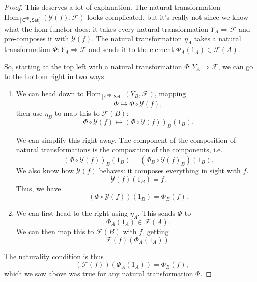 \documentclass[a4paper,10pt]{scrreprt}
\newcommand{\Hom}{\mathrm{Hom}}
\theoremstyle{definition}
\theoremstyle{plain}
\theoremstyle{remark}
\begin{document}
\begin{proof}
  This deserves a lot of explanation. The natural transformation $\Hom_{[\mathsf{C}^{\text{op}}, \mathsf{Set}]}(\mathcal{Y}(f), \mathcal{F})$ looks complicated, but it's really not since we know what the hom functor does: it takes every natural transformation $Y_{A} \Rightarrow \mathcal{F}$ and pre-composes it with $\mathcal{Y}(f)$. The natural transformation $\eta_{A}$ takes a natural transformation $\Phi\colon Y_{A} \Rightarrow \mathcal{F}$ and sends it to the element $\Phi_{A}(1_{A}) \in \mathcal{F}(A)$.

  So, starting at the top left with a natural transformation $\Phi\colon Y_{A} \Rightarrow \mathcal{F}$, we can go to the bottom right in two ways.
  \begin{enumerate}
    \item We can head down to $\Hom_{[\mathsf{C}^{\text{op}}, \mathsf{Set}]}(Y_{B}, \mathcal{F})$, mapping 
      \begin{equation*}
        \Phi \mapsto \Phi \circ \mathcal{Y}(f),
      \end{equation*}
      then use $\eta_{B}$ to map this to $\mathcal{F}(B)$:
      \begin{equation*}
        \Phi \circ \mathcal{Y}(f) \mapsto (\Phi \circ \mathcal{Y}(f))_{B}(1_{B}).
      \end{equation*}

      We can simplify this right away. The component of the composition of natural transformations is the composition of the components, i.e.
      \begin{equation*}
        (\Phi \circ \mathcal{Y}(f))_{B}(1_{B}) = (\Phi_{B} \circ \mathcal{Y}(f)_{B})(1_{B}).
      \end{equation*}
      We also know how $\mathcal{Y}(f)$ behaves: it composes everything in sight with $f$.
      \begin{equation*}
        \mathcal{Y}(f)(1_{B}) = f.
      \end{equation*}
      Thus, we have
      \begin{equation*}
        (\Phi \circ \mathcal{Y}(f))(1_{B}) = \Phi_{B}(f).
      \end{equation*}

    \item We can first head to the right using $\eta_{A}$. This sends $\Phi$ to 
      \begin{equation*}
        \Phi_{A}(1_{A}) \in \mathcal{F}(A).
      \end{equation*}
      We can then map this to $\mathcal{F}(B)$ with $f$, getting
      \begin{equation*}
        \mathcal{F}(f)(\Phi_{A}(1_{A})).
      \end{equation*}
  \end{enumerate}

  The naturality condition is thus
  \begin{equation*}
    (\mathcal{F}(f))(\Phi_{A}(1_{A})) = \Phi_{B}(f),
  \end{equation*}
  which we saw above was true for any natural transformation $\Phi$.
\end{proof}
\end{document}
